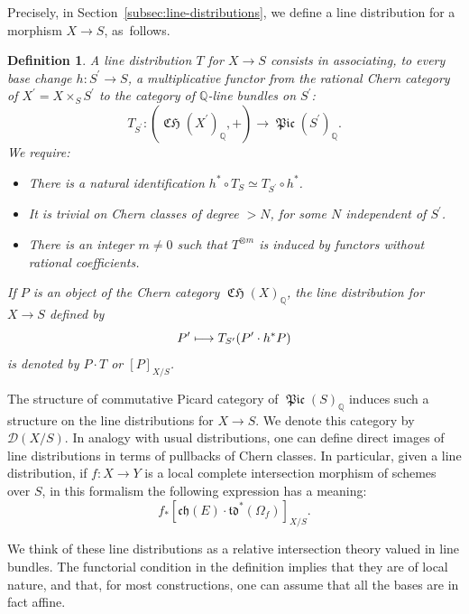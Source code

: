 \documentclass[JEP,XML,SOM,Unicode,published]{cedram}
\newcommand\mto{\mathchoice{\longmapsto}{\mapsto}{\mapsto}{\mapsto}}
\theoremstyle{plain}
\newtheorem*{definition-intro}{Definition}
\theoremstyle{definition}
\newcommand{\QBbb}{\mathbb Q}
\newcommand{\Dcal}{\mathcal D}
\newcommand{\chfrak}{\mathfrak {ch}}
\newcommand{\tdfrak}{\mathfrak {td}}
\DeclareMathOperator{\CHfrak}{\mathfrak{CH}}
\DeclareMathOperator{\Picfr}{\mathfrak{Pic}}
\begin{document}
Precisely, in Section~\ref{subsec:line-distributions}, we define a line distribution for a morphism $X\to S$, as~follows.

\begin{definition-intro}

A line distribution $T$ for $X\to S$ consists in associating, to every base change $h: S^{\prime}\to S$, a multiplicative functor from the rational Chern category of $X^{\prime}=X\times_{S}S^{\prime}$ to the category of $\QBbb$-line bundles on $S^{\prime}$:
\begin{displaymath}
T_{S^{\prime}} : (\CHfrak(X^{\prime})_\QBbb,+) \to \Picfr(S^{\prime})_{\QBbb}.
\end{displaymath}
We require:
\begin{itemize}
\item There is a natural identification $h^{\ast}\circ T_{S} \simeq T_{S^{\prime}}\circ h^{\ast}$.
\item It is trivial on Chern classes of degree $> N$, for some $N$ independent of $S^{\prime}$.
\item There is an integer $m\neq 0$ such that $T^{\otimes m}$ is induced by functors without rational coefficients.

\end{itemize}
If $P$ is an object of the Chern category $\CHfrak(X)_\QBbb$, the line distribution for $X\to S$ defined by
\begin{displaymath}
P^{\prime} \mto T_{S^{\prime}}(P^{\prime} \cdot h^\ast P)
\end{displaymath}
is denoted by $P\cdot T$ or $[P]_{X/S}$.
\end{definition-intro}

The structure of commutative Picard category of $\Picfr(S)_{\QBbb}$ induces such a structure on the line distributions for $X\to S$. We denote this category by $\Dcal(X/S)$. In analogy with usual distributions, one can define direct images of line distributions in terms of pullbacks of Chern classes. In particular, given a line distribution, if $f: X\to Y$ is a local complete intersection morphism of schemes over $S$, in this formalism the following expression has a meaning:
\begin{equation}\label{eq:introdirectimage}
f_\ast [\chfrak(E) \cdot \tdfrak^{\ast} (\Omega_f)]_{X/S}.
\end{equation}

We think of these line distributions as a relative intersection theory valued in line bundles. The functorial condition in the definition implies that they are of local nature, and that, for most constructions, one can assume that all the bases are in fact affine.
\end{document}
